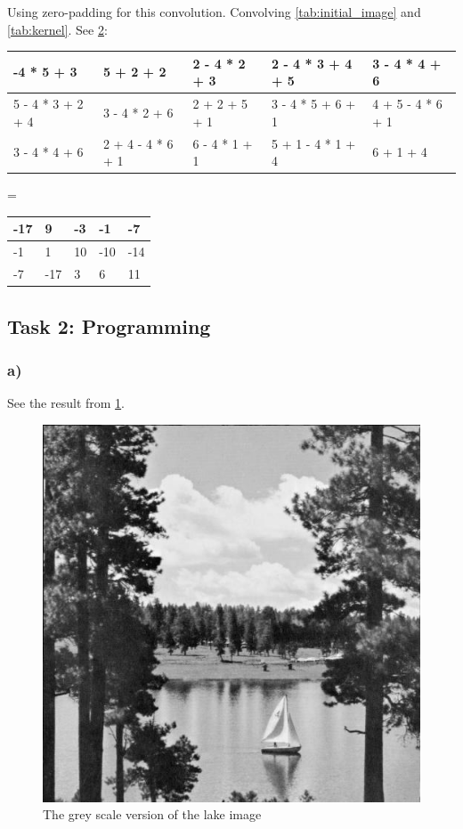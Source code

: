 Using zero-padding for this convolution. Convolving \cref{tab:initial_image} and \cref{tab:kernel}. See \cref{tab:kernel_convolution}: 
\begin{table}[]
    \label{tab:kernel_convolution}
    \begin{tabular}{|l|l|l|l|l|}
        \hline
        -4 * 5 + 3 & 5 + 2 + 2 & 2 - 4 * 2 + 3 & 2 - 4 * 3 + 4 + 5 & 3 - 4 * 4 + 6 \\ \hline
        5 - 4 * 3 + 2 + 4 & 3 - 4 * 2 + 6 & 2 + 2 + 5 + 1 & 3 - 4 * 5 + 6 + 1 & 4 + 5 - 4 * 6 + 1 \\ \hline 
        3 - 4 * 4 + 6 & 2 + 4 - 4 * 6 + 1 & 6 - 4 * 1 + 1 & 5 + 1 - 4 * 1 + 4 & 6 + 1 + 4 \\ \hline
    \end{tabular} 
    = \begin{tabular}{|l|l|l|l|l|}
        \hline
        -17 & 9 & -3 & -1 & -7 \\ \hline
        -1 & 1 & 10 & -10 & -14 \\ \hline 
        -7 & -17 & 3 & 6 & 11 \\ \hline
    \end{tabular} 
\end{table}

\newpage
\subsection{Task 2: Programming}
\subsubsection*{a)}
See the result from \cref{fig:greyscale}. 
\begin{figure}[]
    \centering
    \includegraphics[width=1.00\textwidth]{figures/image_processed/lake_greyscale.jpg}
    \caption{The grey scale version of the lake image}
    \label{fig:greyscale}
\end{figure}

